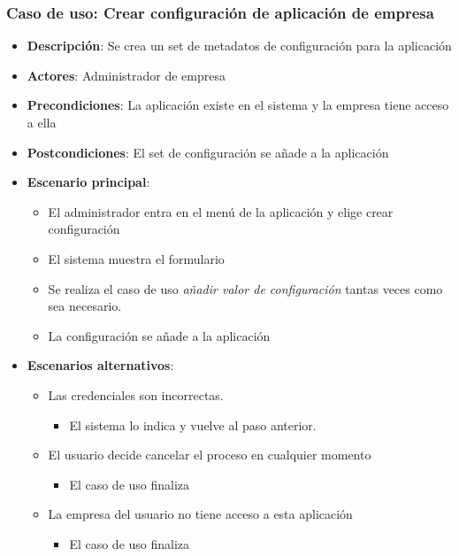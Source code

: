 \documentclass[12pt,a4paperpaper,]{report}
\providecommand{\tightlist}{%
  \setlength{\itemsep}{0pt}\setlength{\parskip}{0pt}}
\begin{document}
\subsubsection{Caso de uso: Crear configuración de aplicación de
empresa}\label{caso-de-uso-crear-configuraciuxf3n-de-aplicaciuxf3n-de-empresa}

\begin{itemize}
\tightlist
\item
  \textbf{Descripción}: Se crea un set de metadatos de configuración
  para la aplicación
\item
  \textbf{Actores}: Administrador de empresa
\item
  \textbf{Precondiciones}: La aplicación existe en el sistema y la
  empresa tiene acceso a ella
\item
  \textbf{Postcondiciones}: El set de configuración se añade a la
  aplicación
\item
  \textbf{Escenario principal}:

  \begin{itemize}
  \tightlist
  \item
    El administrador entra en el menú de la aplicación y elige crear
    configuración
  \item
    El sistema muestra el formulario
  \item
    Se realiza el caso de uso \emph{añadir valor de configuración}
    tantas veces como sea necesario.
  \item
    La configuración se añade a la aplicación
  \end{itemize}
\item
  \textbf{Escenarios alternativos}:

  \begin{itemize}
  \tightlist
  \item
    Las credenciales son incorrectas.

    \begin{itemize}
    \tightlist
    \item
      El sistema lo indica y vuelve al paso anterior.
    \end{itemize}
  \item
    El usuario decide cancelar el proceso en cualquier momento

    \begin{itemize}
    \tightlist
    \item
      El caso de uso finaliza
    \end{itemize}
  \item
    La empresa del usuario no tiene acceso a esta aplicación

    \begin{itemize}
    \tightlist
    \item
      El caso de uso finaliza
    \end{itemize}
  \end{itemize}
\end{itemize}
\end{document}
